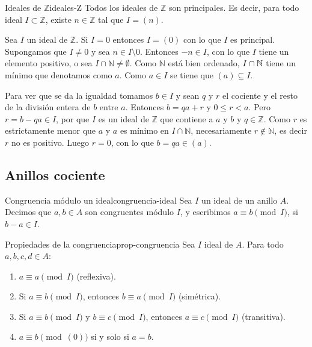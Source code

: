 \begin{proposition}{Ideales de \(\mathbb{Z}\)}{ideales-Z}
    Todos los ideales de \(\mathbb{Z}\) son principales. Es decir, para todo ideal \(I \subset \mathbb{Z}\), existe \(n \in \mathbb{Z}\) tal que \(I = (n)\).
\end{proposition}

\begin{proofbox}
    Sea \(I\) un ideal de \(\mathbb{Z}\). Si \(I=0\) entonces \(I=(0)\) con lo que \(I\) es principal. Supongamos que \(I\neq 0\) y sea \(n\in I\setminus 0\). Entonces \(-n\in I\), con lo que \(I\) tiene un elemento positivo, o sea \(I\cap\mathbb{N}\neq\emptyset\). Como \(\mathbb{N}\) está bien ordenado, \(I \cap \mathbb{N}\) tiene un mínimo que denotamos como \(a\). Como \(a\in I\) se tiene que \((a)\subseteq I\).
    
    Para ver que se da la igualdad tomamos \(b\in I\) y sean \(q\) y \(r\) el cociente y el resto de la división entera de \(b\) entre \(a\). Entonces \(b=qa+r\) y \(0\leq r<a\). Pero \(r=b-qa\in I\), por que \(I\) es un ideal de \(\mathbb{Z}\) que contiene a \(a\) y \(b\) y \(q\in\mathbb{Z}\). Como \(r\) es estrictamente menor que \(a\) y \(a\) es mínimo en \(I\cap\mathbb{N}\), necesariamente \(r\not\in\mathbb{N}\), es decir \(r\) no es positivo. Luego \(r=0\), con lo que \(b=qa\in(a)\).
\end{proofbox}

\subsection{Anillos cociente}

\begin{definition}{Congruencia módulo un ideal}{congruencia-ideal}
    Sea \(I\) un ideal de un anillo \(A\). Decimos que \(a, b \in A\) son {congruentes módulo \(I\)}, y escribimos \(a \equiv b \pmod{I}\), si \(b - a \in I\).
\end{definition}

\begin{lemma}{Propiedades de la congruencia}{prop-congruencia}
    Sea \(I\) ideal de \(A\). Para todo \(a, b, c, d \in A\):
    \begin{enumerate}
        \item \(a \equiv a \pmod{I}\) (reflexiva).
        \item Si \(a \equiv b \pmod{I}\), entonces \(b \equiv a \pmod{I}\) (simétrica).
        \item Si \(a \equiv b \pmod{I}\) y \(b \equiv c \pmod{I}\), entonces \(a \equiv c \pmod{I}\) (transitiva).
        \item \(a \equiv b \pmod{(0)}\) si y solo si \(a = b\).
    \end{enumerate}
\end{lemma}

